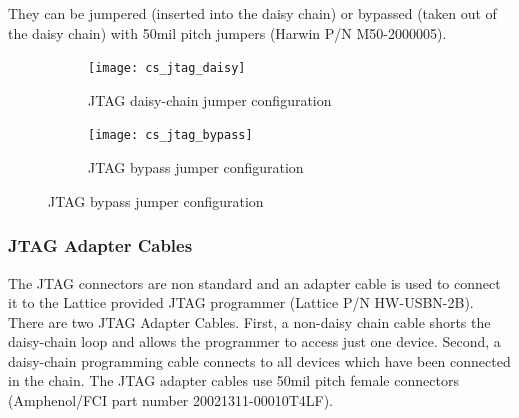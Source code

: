 \documentclass{article}
\begin{document}
They can be jumpered (inserted into the daisy chain) or bypassed (taken out of the daisy chain) with 50mil pitch jumpers (Harwin P/N M50-2000005).


\begin{figure}[H]
  \centering
  \begin{subfigure}{0.5\textwidth}
    \centering
    \texttt{[image: cs\_jtag\_daisy]}
    \caption{JTAG daisy-chain jumper configuration}
    \label{fig:csjtagdaisy}
  \end{subfigure}%
  \begin{subfigure}{0.5\textwidth}
    \centering
    \texttt{[image: cs\_jtag\_bypass]}
    \caption{JTAG bypass jumper configuration}
    \label{fig:csjtagbypass}
  \end{subfigure}
\end{figure}


\subsubsection{JTAG Adapter Cables}


The JTAG connectors are non standard and an adapter cable is used to connect it to the Lattice provided JTAG programmer (Lattice P/N HW-USBN-2B). There are two JTAG Adapter Cables. First, a non-daisy chain cable shorts the daisy-chain loop and allows the programmer to access just one device. Second, a daisy-chain programming cable connects to all devices which have been connected in the chain. The JTAG adapter cables use 50mil pitch female connectors (Amphenol/FCI part number 20021311-00010T4LF).
\end{document}
